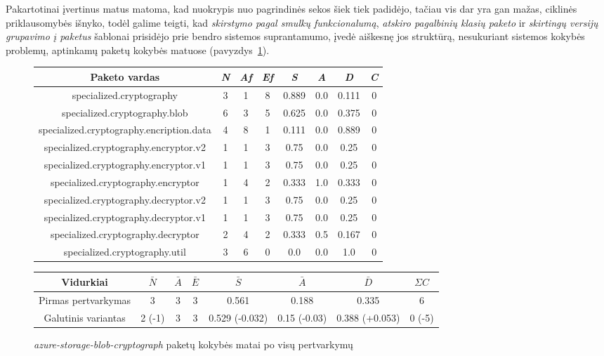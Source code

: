 Pakartotinai įvertinus matus matoma, kad nuokrypis nuo pagrindinės sekos šiek tiek padidėjo, tačiau
vis dar yra gan mažas, ciklinės priklausomybės išnyko, todėl galime teigti, kad \textit{skirstymo pagal smulkų funkcionalumą},
\textit{atskiro pagalbinių klasių paketo} ir \textit{skirtingų versijų grupavimo į paketus} šablonai prisidėjo prie bendro
sistemos suprantamumo, įvedė aiškesnę jos struktūrą, nesukuriant sistemos kokybės problemų, aptinkamų paketų kokybės matuose (pavyzdys~\ref{table:verts}).
\begin{figure}[H]
\begin{center}
    \begin{tabular}{|c|c|c|c|c|c|c|c|}
        \hline
        Paketo vardas & \textit{N} & \textit{Af} & \textit{Ef} & \textit{S} & \textit{A} & \textit{D} & \textit{C} \\ [0.5ex]
        \hline\hline
        specialized.cryptography & 3 & 1 & 8 & 0.889 & 0.0 & 0.111 & 0 \\
        \hline
        specialized.cryptography.blob & 6 & 3 & 5 & 0.625 & 0.0 & 0.375 & 0 \\
        \hline
        specialized.cryptography.encription.data & 4 & 8 & 1 & 0.111 & 0.0 & 0.889 & 0 \\
        \hline
        specialized.cryptography.encryptor.v2 & 1 & 1 & 3 & 0.75 & 0.0 & 0.25 & 0 \\
        \hline
        specialized.cryptography.encryptor.v1 & 1 & 1 & 3 & 0.75 & 0.0 & 0.25 & 0 \\
        \hline
        specialized.cryptography.encryptor & 1 & 4 & 2 & 0.333 & 1.0 & 0.333 & 0 \\
        \hline
        specialized.cryptography.decryptor.v2 & 1 & 1 & 3 & 0.75 & 0.0 & 0.25 & 0 \\
        \hline
        specialized.cryptography.decryptor.v1 & 1 & 1 & 3 & 0.75 & 0.0 & 0.25 & 0 \\
        \hline
        specialized.cryptography.decryptor & 2 & 4 & 2 & 0.333 & 0.5 & 0.167 & 0 \\
        \hline
        specialized.cryptography.util & 3 & 6 & 0 & 0.0 & 0.0 & 1.0 & 0 \\
        \hline
    \end{tabular}
    \begin{tabular}{|c|c|c|c|c|c|c|c|}
        \hline
        Vidurkiai & $\bar{N}$ & $\bar{A}$ & $\bar{E}$ & $\bar{S}$ & $\bar{A}$ & $\bar{D}$ & $\Sigma C$ \\ [0.5ex]
        \hline\hline
        Pirmas pertvarkymas & 3 & 3 & 3 & 0.561 & 0.188 & 0.335 & 6 \\
        Galutinis variantas & \cellcolor{green!25} 2 (-1) & 3 & 3 & \cellcolor{green!25} 0.529 (-0.032) & \cellcolor{red!25} 0.15 (-0.03) & \cellcolor{red!25} 0.388 (+0.053) &  \cellcolor{green!25} 0 (-5) \\
        \hline
    \end{tabular}
\end{center}
\caption{\textit{azure-storage-blob-cryptograph} paketų kokybės matai po visų pertvarkymų}
\label{table:verts}
\end{figure}
